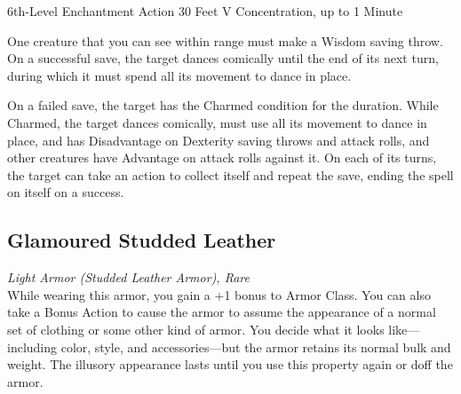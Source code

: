 \documentclass[letterpaper,openany,oneside,twocolumn]{book}
\begin{document}
	{6th-Level Enchantment}
	{Action}
	{30 Feet}
	{V}
	{Concentration, up to 1 Minute}

One creature that you can see within range must make a Wisdom saving throw. On a successful save, the target dances comically until the end of its next turn, during which it must spend all its movement to dance in place.

On a failed save, the target has the Charmed condition for the duration. While Charmed, the target dances comically, must use all its movement to dance in place, and has Disadvantage on Dexterity saving throws and attack rolls, and other creatures have Advantage on attack rolls against it. On each of its turns, the target can take an action to collect itself and repeat the save, ending the spell on itself on a success.

\subsection*{Glamoured Studded Leather}
\textit{Light Armor (Studded Leather Armor), Rare}\\
{\entryfont While wearing this armor, you gain a +1 bonus to Armor Class. You can also take a Bonus Action to cause the armor to assume the appearance of a normal set of clothing or some other kind of armor. You decide what it looks like—including color, style, and accessories—but the armor retains its normal bulk and weight. The illusory appearance lasts until you use this property again or doff the armor.}
\end{document}
